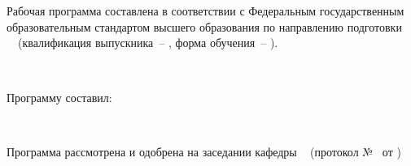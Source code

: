 \chapter*{}							
Рабочая программа составлена в соответствии с Федеральным государственным образовательным стандартом высшего образования по направлению подготовки \SpecialityCode~\SpecialityName~(квалификация выпускника~-- \Qualification, форма обучения~-- \FormOfStudy).

~\par

Программу составил:\par
\AuthorPost \par
\AuthorDepartment \hfill \AuthorName

~\par

Программа рассмотрена и одобрена на заседании кафедры \AuthorDepartment~  (протокол №\ProtocolNumber~ от \ProtocolDate)

~\par

\DepartmentHead \par
\AuthorDepartment \par
\HeadPost \hfill \HeadName




